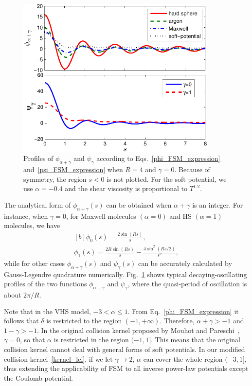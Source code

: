 \begin{figure}[t]
	\centering
	\includegraphics[width=10cm]{Chapter4/IMG/phi_psi2.pdf}
	\caption{
		Profiles of $\phi_{\alpha+\gamma}$  and $\psi_\gamma$ according to Eqs.~\eqref{phi_FSM_expression} and~\eqref{psi_FSM_expression} when $R=4$ and $\gamma=0$. Because of symmetry, the region $s<0$ is not plotted. For the soft potential, we use $\alpha=-0.4$ and the shear viscosity is proportional to $T^{1.2}$.
	}
	\label{phi_psi}
\end{figure}

The analytical form of $\phi_{\alpha+\gamma}(s)$ can be obtained when $\alpha+\gamma$ is an integer. For instance, when $\gamma=0$, for Maxwell molecules $(\alpha=0)$ and HS $(\alpha=1)$ molecules, we have
\begin{equation}\label{int_res}
  \begin{aligned}[b]
    \phi_0(s)=\frac{2\sin(Rs)}{s},\\
    \phi_1(s)=\frac{2R\sin(Rs)}{s}-\frac{4\sin^2(Rs/2)}{s^2},
  \end{aligned}
\end{equation}
while for  other cases $\phi_{\alpha+\gamma}(s)$ and $\psi_{\gamma}(s)$ can be accurately calculated by Gauss-Legendre quadrature numerically. Fig.~\ref{phi_psi} shows typical decaying-oscillating profiles of the two functions $\phi_{\alpha+\gamma}$ and $\psi_\gamma$, where  the quasi-period of oscillation is about $2\pi/R$.




Note that in the VHS model, $-3<\alpha\le1$. From Eq.~\eqref{phi_FSM_expression} it follows that $\delta$ is restricted to the region $(-1,+\infty)$. Therefore, $\alpha+\gamma>-1$ and $1-\gamma>-1$. In the original collision kernel proposed by Mouhot and Pareschi~\cite{Mouhot2006}, $\gamma=0$, so that $\alpha$ is restricted in the region $(-1,1]$. This means that the original collision kernel cannot deal with general forms of soft potentials. In our modified collision kernel~\eqref{kernel_lei}, if we let $\gamma\rightarrow2$, $\alpha$ can cover the whole region $(-3,1]$, thus extending the applicability of FSM to all inverse power-law potentials except the Coulomb potential. 


